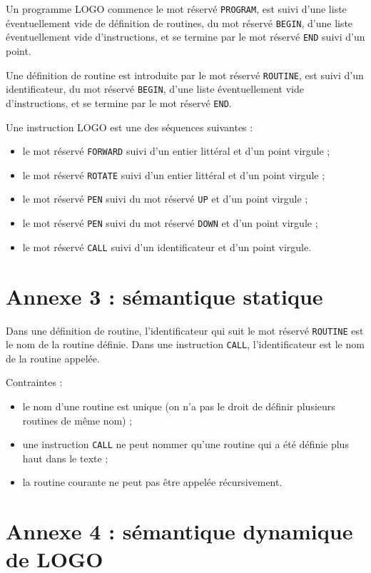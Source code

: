 Un programme LOGO commence le mot réservé \texttt{PROGRAM}, est suivi d'une liste éventuellement vide de définition de routines, du mot réservé \texttt{BEGIN}, d'une liste éventuellement vide d'instructions, et se termine par le mot réservé \texttt{END} suivi d'un point.

Une définition de routine est introduite par le mot réservé \texttt{ROUTINE}, est suivi d'un identificateur, du mot réservé \texttt{BEGIN}, d'une liste éventuellement vide d'instructions, et se termine par le mot réservé \texttt{END}.

Une instruction LOGO est une des séquences suivantes :
\begin{itemize}
  \item le mot réservé \texttt{FORWARD} suivi d'un entier littéral et d'un point virgule ;
  \item le mot réservé \texttt{ROTATE} suivi d'un entier littéral et d'un point virgule ;
  \item le mot réservé \texttt{PEN} suivi du mot réservé \texttt{UP} et d'un point virgule ;
  \item le mot réservé \texttt{PEN} suivi du mot réservé \texttt{DOWN} et d'un point virgule ;
  \item le mot réservé \texttt{CALL} suivi d'un identificateur et d'un point virgule.
\end{itemize}

\section{Annexe 3 : sémantique statique}

Dans une définition de routine, l'identificateur qui suit le mot réservé \texttt{ROUTINE} est le nom de la routine définie. Dans une instruction \texttt{CALL}, l'identificateur est le nom de la routine appelée.

Contraintes :
\begin{itemize}
  \item le nom d'une routine est unique (on n'a pas le droit de définir plusieurs routines de même nom) ;
  \item une instruction \texttt{CALL} ne peut nommer qu'une routine qui a été définie plus haut dans le texte ;
  \item la routine courante ne peut pas être appelée récursivement.
\end{itemize}

\section{Annexe 4 : sémantique dynamique de LOGO}

